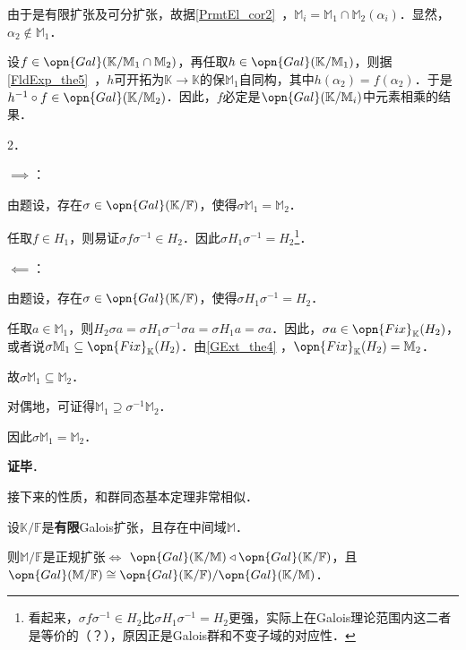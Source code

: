 由于是有限扩张及可分扩张，故据\autoref{PrmtEl_cor2}~，$\mathbb{M}_i=\mathbb{M}_1\cap\mathbb{M}_2(\alpha_i)$．显然，$\alpha_2\not\in\mathbb{M}_1$．

设$f\in\opn{Gal}(\mathbb{K}/\mathbb{M}_1\cap\mathbb{M}_2)$，再任取$h\in\opn{Gal}(\mathbb{K}/\mathbb{M}_1)$，则据\autoref{FldExp_the5}~，$h$可开拓为$\mathbb{K}\to\mathbb{K}$的保$\mathbb{M}_1$自同构，其中$h(\alpha_2)=f(\alpha_2)$．于是$h^{-1}\circ f\in\opn{Gal}(\mathbb{K}/\mathbb{M}_2)$．因此，$f$必定是$\opn{Gal}(\mathbb{K}/\mathbb{M}_i)$中元素相乘的结果．

2．

$\implies$：

由题设，存在$\sigma\in\opn{Gal}(\mathbb{K}/\mathbb{F})$，使得$\sigma \mathbb{M}_1=\mathbb{M}_2$．

任取$f\in H_1$，则易证$\sigma f\sigma^{-1}\in H_2$．因此$\sigma H_1\sigma^{-1}=H_2$\footnote{看起来，$\sigma f\sigma^{-1}\in H_2$比$\sigma H_1\sigma^{-1}=H_2$更强，实际上在Galois理论范围内这二者是等价的（？），原因正是Galois群和不变子域的对应性．}．

$\impliedby$：

由题设，存在$\sigma\in\opn{Gal}(\mathbb{K}/\mathbb{F})$，使得$\sigma H_1\sigma^{-1}=H_2$．

任取$a\in\mathbb{M}_{1}$，则$H_2 \sigma a=\sigma H_1\sigma^{-1}\sigma a=\sigma H_1 a=\sigma a$．因此，$\sigma a\in\opn{Fix}_\mathbb{K}(H_2)$，或者说$\sigma\mathbb{M}_1\subseteq\opn{Fix}_\mathbb{K}(H_2)$．由\autoref{GExt_the4} ，$\opn{Fix}_\mathbb{K}(H_2)=\mathbb{M}_2$．

故$\sigma\mathbb{M}_1\subseteq\mathbb{M}_2$．

对偶地，可证得$\mathbb{M}_1\supseteq\sigma^{-1}\mathbb{M}_2$．

因此$\sigma\mathbb{M}_1=\mathbb{M}_2$．




\textbf{证毕}．




接下来的性质，和群同态基本定理非常相似．

\begin{theorem}{}\label{GExt_the8}
设$\mathbb{K}/\mathbb{F}$是\textbf{有限}Galois扩张，且存在中间域$\mathbb{M}$．

则$\mathbb{M}/\mathbb{F}$是正规扩张$\iff$ $\opn{Gal}(\mathbb{K/\mathbb{M}})\triangleleft\opn{Gal}(\mathbb{K/\mathbb{F}})$，且$\opn{Gal}(\mathbb{M}/\mathbb{F})\cong \opn{Gal}(\mathbb{K}/\mathbb{F})/\opn{Gal}(\mathbb{K}/\mathbb{M})$．
\end{theorem}

